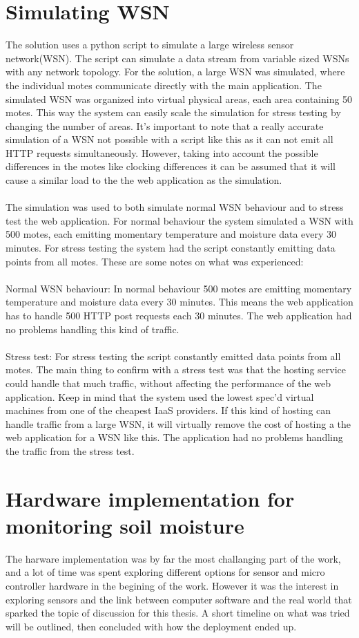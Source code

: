 \documentclass[]{uiophd}
\begin{document}
\section{Simulating WSN}
The solution uses a python script to simulate a large wireless sensor network(WSN). The script can simulate a data stream from variable sized WSNs with any network topology. For the solution, a large WSN was simulated, where the individual motes communicate directly with the main application. The simulated WSN was organized into virtual physical areas, each area containing 50 motes. This way the system can easily scale the simulation for stress testing by changing the number of areas. It’s important to note that a really accurate simulation of a WSN not possible with a script like this as it can not emit all HTTP requests simultaneously. However, taking into account the possible differences in the motes like clocking differences it can be assumed that it will cause a similar load to the the web application as the simulation.
\\\\
The simulation was used to both simulate normal WSN behaviour and to stress test the web application. For normal behaviour the system simulated a WSN with 500 motes, each emitting momentary temperature and moisture data every 30 minutes. For stress testing the system had the script constantly emitting data points from all motes. These are some notes on what was experienced:
\\\\
Normal WSN behaviour: In normal behaviour 500 motes are emitting momentary temperature and moisture data every 30 minutes. This means the web application has to handle 500 HTTP post requests each 30 minutes. The web application had no problems handling this kind of traffic.
\\\\
Stress test:  For stress testing the script constantly emitted data points from all motes. The main thing to confirm with a stress test was that the hosting service could handle that much traffic, without affecting the performance of the web application. Keep in mind that the system used the lowest spec’d virtual machines from one of the cheapest IaaS providers. If this kind of hosting can handle traffic from a large WSN, it will virtually remove the cost of hosting a the web application for a WSN like this. The application had no problems handling the traffic from the stress test.

  
\section{Hardware implementation for monitoring soil moisture}
The harware implementation was by far the most challanging part of the work, and a lot of time was spent exploring different options for sensor and micro controller hardware in the begining of the work. However it was the interest in exploring sensors and the link between computer software and the real world that sparked the topic of discussion for this thesis. A short timeline on what was tried will be outlined, then concluded with how the deployment ended up.
\end{document}
